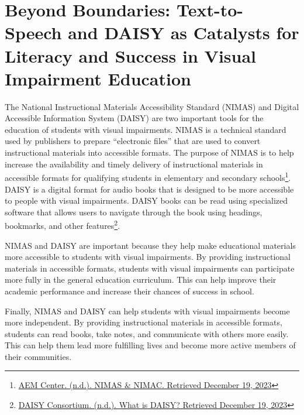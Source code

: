 \hypertarget{audio}{}\chapter[\raggedright Beyond Boundaries:\hfill\break Text-to-Speech and DAISY as Catalysts for Literacy and Success\hfill\break in Visual Impairment Education]{Beyond Boundaries: Text-to-Speech and DAISY as Catalysts for Literacy and Success in Visual Impairment Education}\label{audio}
\noindent\makebox[\linewidth]{\rule{\linewidth}{0.4pt}}
{\let\clearpage\relax\localtableofcontents\let\clearpage\relax\locallistoftables}\newpage
The National Instructional Materials Accessibility Standard (NIMAS) and Digital Accessible Information System (DAISY) are two important tools for the education of students with visual impairments. NIMAS is a technical standard used by publishers to prepare “electronic files” that are used to convert instructional materials into accessible formats. The purpose of NIMAS is to help increase the availability and timely delivery of instructional materials in accessible formats for qualifying students in elementary and secondary schools\footnote{\raggedright \href{https://aem.cast.org/nimas-nimac/nimas-nimac}{AEM Center. (n.d.). NIMAS \& NIMAC. Retrieved December 19, 2023}}. DAISY is a digital format for audio books that is designed to be more accessible to people with visual impairments. DAISY books can be read using specialized software that allows users to navigate through the book using headings, bookmarks, and other features\footnote{\raggedright \href{https://daisy.org/about_us/what-is-daisy/}{DAISY Consortium. (n.d.). What is DAISY? Retrieved December 19, 2023}}.

NIMAS and DAISY are important because they help make educational materials more accessible to students with visual impairments. By providing instructional materials in accessible formats, students with visual impairments can participate more fully in the general education curriculum. This can help improve their academic performance and increase their chances of success in school.

Finally, NIMAS and DAISY can help students with visual impairments become more independent. By providing instructional materials in accessible formats, students can read books, take notes, and communicate with others more easily. This can help them lead more fulfilling lives and become more active members of their communities.

